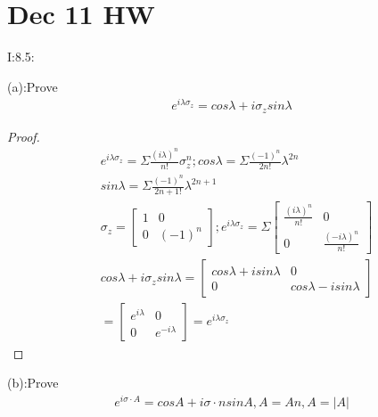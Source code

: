 \documentclass{article}
\begin{document}
\newpage

\section{Dec 11 HW}

I:8.5:

(a):Prove \begin{align*}e^{i\lambda \sigma_z}=cos\lambda+i\sigma_zsin\lambda\end{align*}

\begin{proof}
\begin{align*}
&e^{i\lambda\sigma_z}=\Sigma\frac{(i\lambda)^n}{n!}\sigma_z^n;cos\lambda=\Sigma\frac{(-1)^{n}}{2n!}\lambda^{2n}\\
&sin\lambda=\Sigma\frac{(-1)^{n}}{2n+1!}\lambda^{2n+1}\\
&\sigma_z=
\begin{bmatrix}
  1&0\\0&(-1)^n
\end{bmatrix};e^{i\lambda\sigma_z}=
\Sigma\begin{bmatrix}
  \frac{(i\lambda)^n}{n!}&0 \\
  0&\frac{(-i\lambda)^n}{n!}
\end{bmatrix}\\
&cos\lambda+i\sigma_zsin\lambda=
\begin{bmatrix}
  cos\lambda+isin\lambda&0\\
  0&cos\lambda-isin\lambda
\end{bmatrix}\\
&=
\begin{bmatrix}
  e^{i\lambda}&0\\
  0&e^{-i\lambda}
\end{bmatrix}=e^{i\lambda\sigma_z}
\end{align*}
\end{proof}

(b):Prove \begin{align*}e^{i\sigma\cdot A}=cosA+i\sigma\cdot nsinA,A=An,A=|A|\end{align*}
\end{document}
